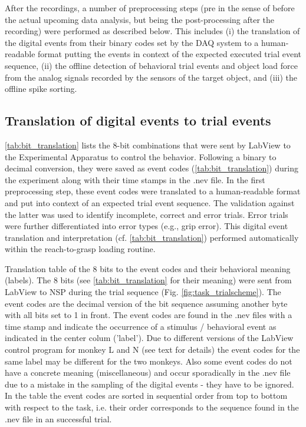 After the recordings, a number of preprocessing steps (pre in the sense of before the actual upcoming data analysis, but being the post-processing after the recording) were performed as described below. This includes (i) the translation of the digital events from their binary codes set by the DAQ system to a human-readable format putting the events in context of the expected executed trial event sequence, (ii) the offline detection of behavioral trial events and object load force from the analog signals recorded by the sensors of the target object, and (iii) the offline spike sorting.

\subsection{Translation of digital events to trial events }

\cref{tab:bit_translation} lists the 8-bit combinations that were sent by LabView to the Experimental Apparatus to control the behavior. Following a binary to decimal conversion, they were saved as event codes (\cref{tab:bit_translation}) during the experiment along with their time stamps in the .nev file. In the first preprocessing step, these event codes were translated to a human-readable format and put into context of an expected trial event sequence. The validation against the latter was used to identify incomplete, correct and error trials. Error trials were further differentiated into error types (e.g., grip error). This digital event translation and interpretation (cf. \cref{tab:bit_translation}) performed automatically within the reach-to-grasp loading routine. 

Translation table of the 8 bits to the event codes and their behavioral meaning (labels). The 8 bits (see \cref{tab:bit_translation} for their meaning) were sent from LabView to NSP during the trial sequence (Fig. \cref{fig:task_trialscheme}). The event codes are the decimal version of the bit sequence assuming another byte with all bits set to 1 in front. The event codes are found in the .nev files with a time stamp and indicate the occurrence of a stimulus / behavioral event as indicated in the center colum ('label'). Due to different versions of the LabView control program for monkey L and N (see text for details) the event codes for the same label may be different for the two monkeys. Also some event codes do not have a concrete meaning (miscellaneous) and occur sporadically in the .nev file due to a mistake in the sampling of the digital events - they have to be ignored. In the table the event codes are sorted in sequential order from top to bottom with respect to the task, i.e. their order corresponds to the sequence found in the .nev file in an successful trial. 

